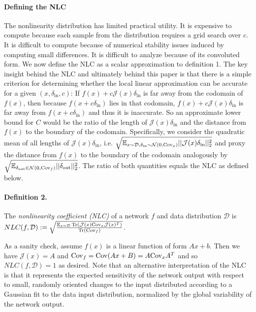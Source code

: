 \documentclass{article} %
\begin{document}
\paragraph{Defining the NLC} The nonlinearity distribution has limited practical utility. It is expensive to compute because each sample from the distribution requires a grid search over $c$. It is difficult to compute because of numerical stability issues induced by computing small differences. It is difficult to analyze because of its convoluted form. We now define the NLC as a scalar approximation to definition 1. The key insight behind the NLC and ultimately behind this paper is that there is a simple criterion for determining whether the local linear approximation can be accurate for a given $(x,\delta_\text{in},c)$: If $f(x) + c\mathcal{J}(x)\delta_\text{in}$ is far away from the codomain of $f(x)$, then because $f(x+c\delta_\text{in})$ lies in that codomain, $f(x) + c\mathcal{J}(x)\delta_\text{in}$ is far away from $f(x+c\delta_\text{in})$ and thus it is inaccurate. So an approximate lower bound for $C$ would be the ratio of the length of $\mathcal{J}(x)\delta_\text{in}$ and the distance from $f(x)$ to the boundary of the codomain. Specifically, we consider the quadratic mean of all lengths of $\mathcal{J}(x)\delta_\text{in}$, i.e. $\sqrt{\mathbb{E}_{x \sim \mathcal{D}, \delta_\text{in} \sim \mathcal{N}(0, \mathrm{Cov}_x)} ||\mathcal{J}(x)\delta_\text{in}||_2^2}$ and proxy the distance from $f(x)$ to the boundary of the codomain analogously by $\sqrt{\mathbb{E}_{\delta_\text{out} \in \mathcal{N}(0,\mathrm{Cov}_f)} ||\delta_\text{out}||_2^2}$. The ratio of both quantities equals the NLC as defined below.

\paragraph{Definition 2.} The {\it nonlinearity coefficient (NLC)} of a network $f$ and data distribution $\mathcal{D}$ is $NLC(f,\mathcal{D}) := \sqrt{\frac{\mathbb{E}_{x \sim \mathcal{D}}\operatorname{Tr}(\mathcal{J}(x)\mathrm{Cov}_x\mathcal{J}(x)^T)}{\operatorname{Tr}(\mathrm{Cov}_f)}}$.

As a sanity check, assume $f(x)$ is a linear function of form $Ax + b$. Then we have $\mathcal{J}(x) = A$ and $\mathrm{Cov}_f = \mathrm{Cov}(Ax + B) = A\mathrm{Cov}_xA^T$ and so $NLC(f, \mathcal{D}) = 1$ as desired. Note that an alternative interpretation of the NLC is that it represents the expected sensitivity of the network output with respect to small, randomly oriented changes to the input distributed according to a Gaussian fit to the data input distribution, normalized by the global variability of the network output. 
\end{document}
